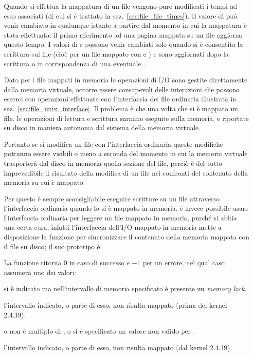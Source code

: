 Quando si effettua la mappatura di un file vengono pure modificati i tempi ad
esso associati (di cui si è trattato in sez.~\ref{sec:file_file_times}). Il
valore di  può venir cambiato in qualunque istante a partire
dal momento in cui la mappatura è stata effettuata: il primo riferimento ad
una pagina mappata su un file aggiorna questo tempo.  I valori di
 e  possono venir cambiati solo quando si è
consentita la scrittura sul file (cioè per un file mappato con
 e ) e sono aggiornati dopo la scrittura
o in corrispondenza di una eventuale .

Dato per i file mappati in memoria le operazioni di I/O sono gestite
direttamente dalla memoria virtuale, occorre essere consapevoli delle
interazioni che possono esserci con operazioni effettuate con l'interfaccia
dei file ordinaria illustrata in sez.~\ref{sec:file_unix_interface}. Il
problema è che una volta che si è mappato un file, le operazioni di lettura e
scrittura saranno eseguite sulla memoria, e riportate su disco in maniera
autonoma dal sistema della memoria virtuale.

Pertanto se si modifica un file con l'interfaccia ordinaria queste modifiche
potranno essere visibili o meno a seconda del momento in cui la memoria
virtuale trasporterà dal disco in memoria quella sezione del file, perciò è
del tutto imprevedibile il risultato della modifica di un file nei confronti
del contenuto della memoria su cui è mappato.

Per questo è sempre sconsigliabile eseguire scritture su un file attraverso
l'interfaccia ordinaria quando lo si è mappato in memoria, è invece possibile
usare l'interfaccia ordinaria per leggere un file mappato in memoria, purché
si abbia una certa cura; infatti l'interfaccia dell'I/O mappato in memoria
mette a disposizione la funzione  per sincronizzare il contenuto
della memoria mappata con il file su disco; il suo prototipo è:

\begin{funcproto}{
}

{La funzione ritorna $0$ in caso di successo e $-1$ per un errore, nel qual
  caso  assumerà uno dei valori: 
  \begin{errlist}
    \item[\errcode{EBUSY}] si è indicato  ma
      nell'intervallo di memoria specificato è presente un \textit{memory lock}.
    \item[\errcode{EFAULT}] l'intervallo indicato, o parte di esso, non
      risulta mappato (prima del kernel 2.4.19).
    \item[\errcode{EINVAL}] o  non è multiplo di
      , o si è specificato un valore non valido per
      .
    \item[\errcode{ENOMEM}] l'intervallo indicato, o parte di esso, non
      risulta mappato (dal kernel 2.4.19).
  \end{errlist}
}
\end{funcproto}

